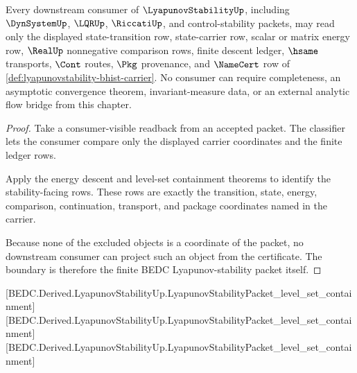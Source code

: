 \begin{theorem}
\label{thm:lyapunovstability-consumer-boundary}
Every downstream consumer of $\LyapunovStabilityUp$, including $\DynSystemUp$, $\LQRUp$, $\RiccatiUp$, and control-stability packets, may read only the displayed state-transition row, state-carrier row, scalar or matrix energy row, $\RealUp$ nonnegative comparison rows, finite descent ledger, $\hsame$ transports, $\Cont$ routes, $\Pkg$ provenance, and $\NameCert$ row of \autoref{def:lyapunovstability-bhist-carrier}. No consumer can require completeness, an asymptotic convergence theorem, invariant-measure data, or an external analytic flow bridge from this chapter.
\end{theorem}
\begin{proof}
Take a consumer-visible readback from an accepted packet. The classifier lets the consumer compare only the displayed carrier coordinates and the finite ledger rows.

Apply the energy descent and level-set containment theorems to identify the stability-facing rows. These rows are exactly the transition, state, energy, comparison, continuation, transport, and package coordinates named in the carrier.

Because none of the excluded objects is a coordinate of the packet, no downstream consumer can project such an object from the certificate. The boundary is therefore the finite BEDC Lyapunov-stability packet itself.
\end{proof}

[BEDC.Derived.LyapunovStabilityUp.LyapunovStabilityPacket\_level\_set\_containment]
[BEDC.Derived.LyapunovStabilityUp.LyapunovStabilityPacket\_level\_set\_containment]
[BEDC.Derived.LyapunovStabilityUp.LyapunovStabilityPacket\_level\_set\_containment]

\begin{closurestatus}{\LyapunovStabilityUp}
  \theoryclosure{\publicClosure}
  \formalstatus{\axiomCleanV}
\end{closurestatus}
